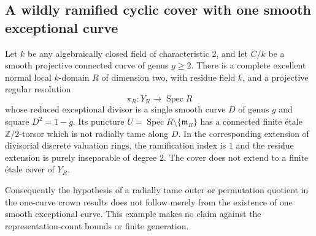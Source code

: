 \subsection{A wildly ramified cyclic cover with one smooth exceptional curve}

\begin{example}
\label{D:one-curve-wild-swap-cover}
Let $k$ be any algebraically closed field of characteristic $2$, and
let $C/k$ be a smooth projective connected curve of genus $g\geq2$.
There is a complete excellent normal local $k$-domain $R$ of dimension
two, with residue field $k$, and a projective regular resolution
\[
       \pi_R:Y_R\longrightarrow\operatorname{Spec}R
                                                        \tag{D.WS.1}
\]
whose reduced exceptional divisor is a single smooth curve $D$ of
genus $g$ and square $D^2=1-g$. Its puncture
$U=\operatorname{Spec}R\setminus\{\mathfrak m_R\}$ has a connected
finite \'etale $\mathbb Z/2$-torsor which is not radially tame along
$D$. In the corresponding extension of divisorial discrete valuation
rings, the ramification index is $1$ and the residue extension is
purely inseparable of degree $2$. The cover does not extend to a
finite \'etale cover of $Y_R$.

Consequently the hypothesis of a radially tame outer or permutation
quotient in the one-curve crown results does not follow merely from
the existence of one smooth exceptional curve. This example makes
no claim against the representation-count bounds or finite generation.
\end{example}

